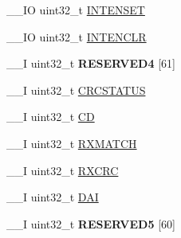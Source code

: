 \begin{DoxyCompactItemize}
\item 
\+\_\+\+\_\+\+I\+O uint32\+\_\+t \hyperlink{struct_n_r_f___r_a_d_i_o___type_a24c26ee25ab2ef6dce64c5a31bdba638}{I\+N\+T\+E\+N\+S\+E\+T}
\item 
\+\_\+\+\_\+\+I\+O uint32\+\_\+t \hyperlink{struct_n_r_f___r_a_d_i_o___type_afdaf7205687af7874c4dac43c8fdb5c7}{I\+N\+T\+E\+N\+C\+L\+R}
\item 
\hypertarget{struct_n_r_f___r_a_d_i_o___type_a069bbd8e0fddd8dc0c2020e8814d0dbe}{}\+\_\+\+\_\+\+I uint32\+\_\+t {\bfseries R\+E\+S\+E\+R\+V\+E\+D4} \mbox{[}61\mbox{]}\label{struct_n_r_f___r_a_d_i_o___type_a069bbd8e0fddd8dc0c2020e8814d0dbe}

\item 
\+\_\+\+\_\+\+I uint32\+\_\+t \hyperlink{struct_n_r_f___r_a_d_i_o___type_a50a208350cc019763379279db218721a}{C\+R\+C\+S\+T\+A\+T\+U\+S}
\item 
\+\_\+\+\_\+\+I uint32\+\_\+t \hyperlink{struct_n_r_f___r_a_d_i_o___type_a347a2dd45280b00d6ca6602c050f0e05}{C\+D}
\item 
\+\_\+\+\_\+\+I uint32\+\_\+t \hyperlink{struct_n_r_f___r_a_d_i_o___type_a333a633b5213068007746c9670b0267d}{R\+X\+M\+A\+T\+C\+H}
\item 
\+\_\+\+\_\+\+I uint32\+\_\+t \hyperlink{struct_n_r_f___r_a_d_i_o___type_a62bcee9d39628a928e6c7545cffa5e5f}{R\+X\+C\+R\+C}
\item 
\+\_\+\+\_\+\+I uint32\+\_\+t \hyperlink{struct_n_r_f___r_a_d_i_o___type_ac42028d8bebc4a1bda73171306f3645e}{D\+A\+I}
\item 
\hypertarget{struct_n_r_f___r_a_d_i_o___type_a952ebea7107bbc0be560961e89fcbfb0}{}\+\_\+\+\_\+\+I uint32\+\_\+t {\bfseries R\+E\+S\+E\+R\+V\+E\+D5} \mbox{[}60\mbox{]}\label{struct_n_r_f___r_a_d_i_o___type_a952ebea7107bbc0be560961e89fcbfb0}


\end{DoxyCompactItemize}
